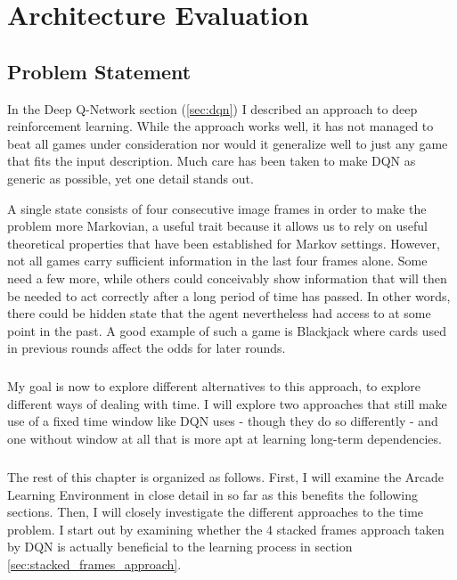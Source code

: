 \chapter{Architecture Evaluation}
\label{chap:experiments}

\section{Problem Statement}
\label{sec:problem_statement}

In the Deep Q-Network section (\ref{sec:dqn})
I described an approach to deep reinforcement learning.
While the approach works well,
it has not managed to beat all games under consideration
nor would it generalize well to just any game
that fits the input description.
Much care has been taken to make DQN as generic as possible,
yet one detail stands out.

A single state consists of four consecutive image frames
in order to make the problem more Markovian,
a useful trait because it allows us to rely on
useful theoretical properties that have been established
for Markov settings.
However, not all games carry sufficient information
in the last four frames alone.
Some need a few more,
while others could conceivably
show information
that will then be needed to act correctly
after a long period of time has passed.
In other words, there could be hidden state
that the agent nevertheless had access to
at some point in the past.
A good example of such a game is Blackjack
where cards used in previous rounds
affect the odds for later rounds.

\paragraph{}
My goal is now to explore different alternatives
to this approach,
to explore different ways of dealing with time.
I will explore two approaches
that still make use of a fixed time window
like DQN uses
- though they do so differently -
and one without window at all
that is more apt at learning long-term dependencies.

\paragraph{}
The rest of this chapter is organized as follows.
First, I will examine the Arcade Learning Environment
in close detail in so far as this benefits
the following sections.
Then, I will closely investigate
the different approaches
to the time problem.
I start out by examining
whether the 4 stacked frames approach taken by DQN
is actually beneficial to the learning process
in section \ref{sec:stacked_frames_approach}.

